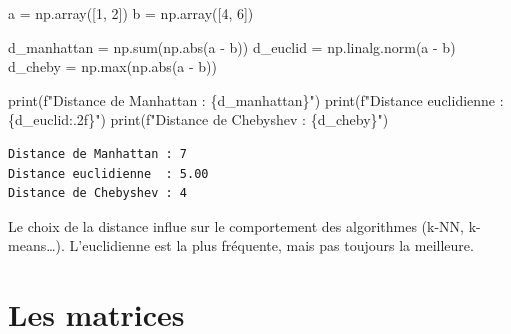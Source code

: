 \documentclass[
  french,
  11pt,
  a4paper,
]{scrbook}
\newenvironment{Shaded}{}{}
\newcommand{\BuiltInTok}[1]{\textcolor[rgb]{0.84,0.23,0.29}{#1}}
\newcommand{\DecValTok}[1]{\textcolor[rgb]{0.00,0.36,0.77}{#1}}
\newcommand{\NormalTok}[1]{\textcolor[rgb]{0.14,0.16,0.18}{#1}}
\newcommand{\OperatorTok}[1]{\textcolor[rgb]{0.14,0.16,0.18}{#1}}
\newcommand{\SpecialCharTok}[1]{\textcolor[rgb]{0.00,0.36,0.77}{#1}}
\newcommand{\SpecialStringTok}[1]{\textcolor[rgb]{0.01,0.18,0.38}{#1}}
\begin{document}
\begin{Shaded}
\begin{Highlighting}[]
\NormalTok{a }\OperatorTok{=}\NormalTok{ np.array([}\DecValTok{1}\NormalTok{, }\DecValTok{2}\NormalTok{])}
\NormalTok{b }\OperatorTok{=}\NormalTok{ np.array([}\DecValTok{4}\NormalTok{, }\DecValTok{6}\NormalTok{])}

\NormalTok{d\_manhattan }\OperatorTok{=}\NormalTok{ np.}\BuiltInTok{sum}\NormalTok{(np.}\BuiltInTok{abs}\NormalTok{(a }\OperatorTok{{-}}\NormalTok{ b))}
\NormalTok{d\_euclid }\OperatorTok{=}\NormalTok{ np.linalg.norm(a }\OperatorTok{{-}}\NormalTok{ b)}
\NormalTok{d\_cheby }\OperatorTok{=}\NormalTok{ np.}\BuiltInTok{max}\NormalTok{(np.}\BuiltInTok{abs}\NormalTok{(a }\OperatorTok{{-}}\NormalTok{ b))}

\BuiltInTok{print}\NormalTok{(}\SpecialStringTok{f"Distance de Manhattan : }\SpecialCharTok{\{}\NormalTok{d\_manhattan}\SpecialCharTok{\}}\SpecialStringTok{"}\NormalTok{)}
\BuiltInTok{print}\NormalTok{(}\SpecialStringTok{f"Distance euclidienne  : }\SpecialCharTok{\{}\NormalTok{d\_euclid}\SpecialCharTok{:.2f\}}\SpecialStringTok{"}\NormalTok{)}
\BuiltInTok{print}\NormalTok{(}\SpecialStringTok{f"Distance de Chebyshev : }\SpecialCharTok{\{}\NormalTok{d\_cheby}\SpecialCharTok{\}}\SpecialStringTok{"}\NormalTok{)}
\end{Highlighting}
\end{Shaded}

\begin{verbatim}
Distance de Manhattan : 7
Distance euclidienne  : 5.00
Distance de Chebyshev : 4
\end{verbatim}

\begin{tcolorbox}[enhanced jigsaw, arc=.35mm, bottomrule=.15mm, bottomtitle=1mm, breakable, colback=white, colbacktitle=quarto-callout-note-color!10!white, colframe=quarto-callout-note-color-frame, coltitle=black, left=2mm, leftrule=.75mm, opacityback=0, opacitybacktitle=0.6, rightrule=.15mm, title=\textcolor{quarto-callout-note-color}{\faInfo}\hspace{0.5em}{🧠 À retenir}, titlerule=0mm, toprule=.15mm, toptitle=1mm]

Le choix de la distance influe sur le comportement des algorithmes
(k-NN, k-means\ldots). L'euclidienne est la plus fréquente, mais pas
toujours la meilleure.

\end{tcolorbox}

\chapter{Les matrices}\label{les-matrices}
\end{document}
